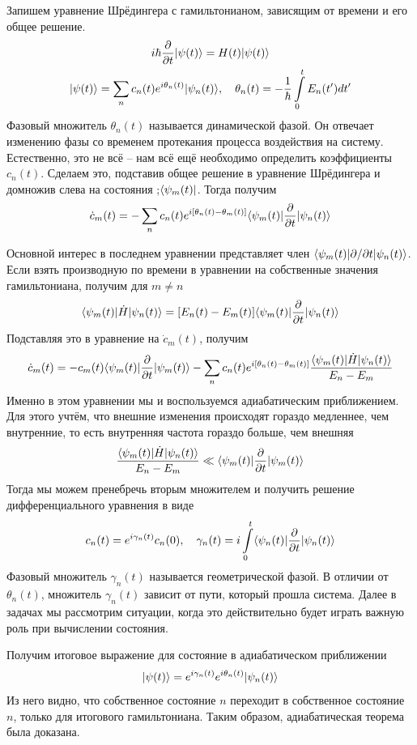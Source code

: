 Запишем уравнение Шрёдингера с гамильтонианом, зависящим от времени и его общее
решение.
\begin{gather*}
  i\hbar\frac{\partial }{\partial t}\lvert\psi(t)\rangle = H(t)\lvert\psi(t)\rangle\\
  \lvert\psi(t)\rangle = \sum\limits_{n}c_n(t)e^{i\theta_n(t)}\lvert\psi_n(t)\rangle,\quad \theta_n(t) = -\frac{1}{\hbar}\int\limits_{0}^t E_n(t')dt'
\end{gather*}
Фазовый множитель $\theta_n(t)$ называется динамической фазой. Он отвечает
изменению фазы со временем протекания процесса воздействия на систему.
Естественно, это не всё -- нам всё ещё необходимо определить коэффициенты
$c_n(t)$. Сделаем это, подставив общее решение в уравнение Шрёдингера и
домножив слева на состояния ;$\langle\psi_m(t)\rvert$. Тогда получим
\[
  \dot c_m (t) = -\sum\limits_{n}c_n(t)e^{i[\theta_n(t) - \theta_m(t)]} \langle\psi_m(t)\rvert\frac{\partial }{\partial t}\lvert\psi_n(t)\rangle
\]

Основной интерес в последнем уравнении представляет член
$\langle\psi_m(t)\rvert\partial/\partial t\lvert\psi_n(t)\rangle$. Если взять производную по
времени в уравнении на собственные значения гамильтониана, получим для $m \neq
  n$
\[
  \langle\psi_m(t)\rvert\dot H\lvert\psi_n(t)\rangle = [E_n(t)- E_m(t)] \langle\psi_m(t)\rvert\frac{\partial }{\partial t}\lvert\psi_n(t)\rangle
\]
Подставляя это в уравнение на $\dot c_m(t)$, получим
\[
  \dot c_m (t) = -c_m(t)\langle\psi_m(t)\rvert\frac{\partial }{\partial t}\lvert\psi_m(t)\rangle -\sum\limits_{n}c_n(t)e^{i[\theta_n(t) - \theta_m(t)]}\frac{\langle\psi_m(t)\rvert\dot H\lvert\psi_n(t)\rangle}{E_n - E_m}
\]
Именно в этом уравнении мы и воспользуемся адиабатическим приближением. Для
этого учтём, что внешние изменения происходят гораздо медленнее, чем
внутренние, то есть внутренняя частота гораздо больше, чем внешняя
\[
  \frac{\langle\psi_m(t)\rvert\dot H\lvert\psi_n(t)\rangle}{E_n - E_m} \ll\langle\psi_m(t)\rvert\frac{\partial }{\partial t}\lvert\psi_m(t)\rangle
\]
Тогда мы можем пренебречь вторым множителем и получить решение
дифференциального уравнения в виде
\[
  c_n(t) = e^{i\gamma_n(t)}c_n(0), \quad \gamma_n(t)= i\int\limits_{0}^{t}\langle\psi_n(t)\rvert\frac{\partial }{\partial t}\lvert\psi_n(t)\rangle
\]
Фазовый множитель $\gamma_n(t)$ называется геометрической фазой. В отличии от
$\theta_n(t)$, множитель $\gamma_n(t)$ зависит от пути, который прошла система.
Далее в задачах мы рассмотрим ситуации, когда это действительно будет играть
важную роль при вычислении состояния.

Получим итоговое выражение для состояние в адиабатическом приближении
\[
  \lvert\psi(t)\rangle = e^{i\gamma_n(t)}e^{i\theta_n(t)}\lvert\psi_n(t)\rangle
\]
Из него видно, что собственное состояние $n$ переходит в собственное состояние
$n$, только для итогового гамильтониана. Таким образом, адиабатическая теорема
была доказана.

